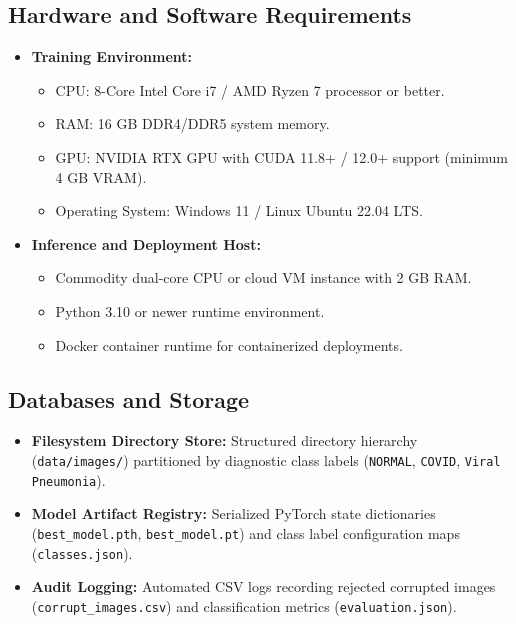 \documentclass[12pt,a4paper]{report}
\begin{document}
\subsection{Hardware and Software Requirements}
\begin{itemize}
    \item \textbf{Training Environment:}
    \begin{itemize}
        \item CPU: 8-Core Intel Core i7 / AMD Ryzen 7 processor or better.
        \item RAM: 16 GB DDR4/DDR5 system memory.
        \item GPU: NVIDIA RTX GPU with CUDA 11.8+ / 12.0+ support (minimum 4 GB VRAM).
        \item Operating System: Windows 11 / Linux Ubuntu 22.04 LTS.
    \end{itemize}
    \item \textbf{Inference and Deployment Host:}
    \begin{itemize}
        \item Commodity dual-core CPU or cloud VM instance with 2 GB RAM.
        \item Python 3.10 or newer runtime environment.
        \item Docker container runtime for containerized deployments.
    \end{itemize}
\end{itemize}

\subsection{Databases and Storage}
\begin{itemize}
    \item \textbf{Filesystem Directory Store:} Structured directory hierarchy (\texttt{data/images/}) partitioned by diagnostic class labels (\texttt{NORMAL}, \texttt{COVID}, \texttt{Viral Pneumonia}).
    \item \textbf{Model Artifact Registry:} Serialized PyTorch state dictionaries (\texttt{best\_model.pth}, \texttt{best\_model.pt}) and class label configuration maps (\texttt{classes.json}).
    \item \textbf{Audit Logging:} Automated CSV logs recording rejected corrupted images (\texttt{corrupt\_images.csv}) and classification metrics (\texttt{evaluation.json}).
\end{itemize}
\end{document}
